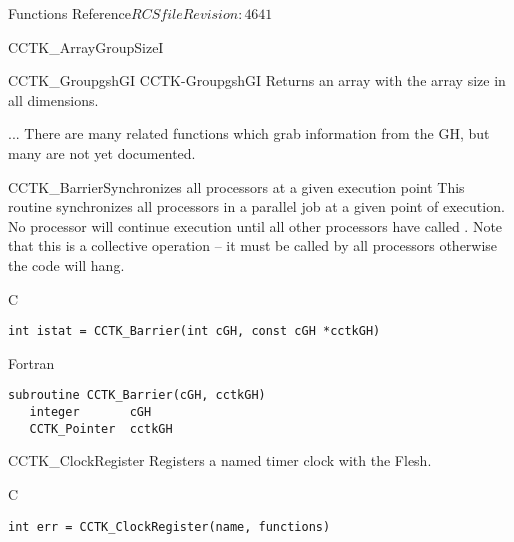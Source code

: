 \begin{cactuspart}{ Functions Reference}{$RCSfile$}{$Revision: 4641 $}
\begin{FunctionDescription}{CCTK\_ArrayGroupSizeI}{}
\begin{SeeAlsoSection}
\begin{SeeAlso2} {CCTK\_GroupgshGI} {CCTK-GroupgshGI}
Returns an array with the array size in all dimensions.
\end{SeeAlso2}
\begin{SeeAlso}{...}
There are many related functions which grab information from the GH,
but many are not yet documented.
\end{SeeAlso}
\end{SeeAlsoSection}
\end{FunctionDescription}



\begin{FunctionDescription}{CCTK\_Barrier}{Synchronizes all processors at a given execution point}
\label{CCTK-Barrier}
This routine synchronizes all processors in a parallel job at a given point of
execution. No processor will continue execution until all other processors
have called . Note that this is a collective operation --
it must be called by all processors otherwise the code will hang.
\begin{SynopsisSection}
\begin{Synopsis}{C}
\begin{verbatim}
int istat = CCTK_Barrier(int cGH, const cGH *cctkGH)
\end{verbatim}
\end{Synopsis}
\begin{Synopsis}{Fortran}
\begin{verbatim}
subroutine CCTK_Barrier(cGH, cctkGH)
   integer       cGH
   CCTK_Pointer  cctkGH
\end{verbatim}
\end{Synopsis}
\end{SynopsisSection}
\end{FunctionDescription}



\begin{FunctionDescription}{CCTK\_ClockRegister}
\label{CCTK-ClockRegister}
Registers a named timer clock with the Flesh.
\begin{SynopsisSection}
\begin{Synopsis}{C}
\begin{verbatim}
int err = CCTK_ClockRegister(name, functions)
\end{verbatim}
\end{Synopsis}
\end{SynopsisSection}


\end{FunctionDescription}
\end{cactuspart}
